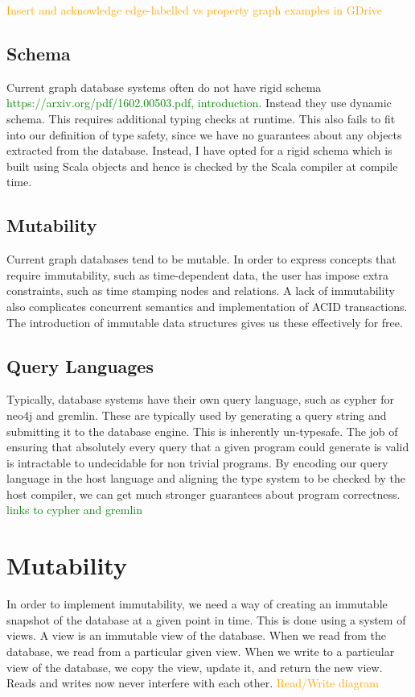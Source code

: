 \documentclass[12pt,a4paper,twoside,openright]{report}
\newcommand\toReference[1]{\textcolor{green}{#1}}
\newcommand\diagramNeeded[1]{\textcolor{orange}{#1}}
\begin{document}
\diagramNeeded{Insert and acknowledge edge-labelled vs property graph examples in GDrive}

\subsection{Schema}
Current graph database systems often do not have rigid schema \toReference{https://arxiv.org/pdf/1602.00503.pdf, introduction}. Instead they use dynamic schema. This requires additional typing checks at runtime. This also fails to fit into our definition of type safety, since we have no guarantees about any objects extracted from the database. Instead, I have opted for a rigid schema which is built using Scala objects and hence is checked by the Scala compiler at compile time.
\subsection{Mutability}
Current graph databases tend to be mutable. In order to express concepts that require immutability, such as time-dependent data, the user has impose extra constraints, such as time stamping nodes and relations. A lack of immutability also complicates concurrent semantics and implementation of ACID transactions. The introduction of immutable data structures gives us these effectively for free.
\subsection{Query Languages}
Typically, database systems have their own query language, such as cypher for neo4j and gremlin. These are typically used by generating a query string and submitting it to the database engine. This is inherently un-typesafe. The job of ensuring that absolutely every query that a given program could generate is valid is intractable to undecidable for non trivial programs. By encoding our query language in the host language and aligning the type system to be checked by the host compiler, we can get much stronger guarantees about program correctness. \toReference{links to cypher and gremlin}

\section{Mutability}
In order to implement immutability, we need a way of creating an immutable snapshot of the database at a given point in time. This is done using a system of views. A view is an immutable view of the database. When we read from the database, we read from a particular given view. When we write to a particular view of the database, we copy the view, update it, and return the new view. Reads and writes now never interfere with each other. \diagramNeeded{Read/Write diagram}
\end{document}
